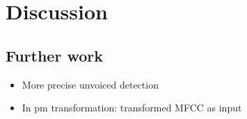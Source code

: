 \chapter{Discussion} %
\label{cha:discussion}

\section{Further work} %
\label{sec:further_work}
\begin{itemize}
	\item More precise unvoiced detection
	\item In pm transformation: transformed MFCC as input
\end{itemize}
